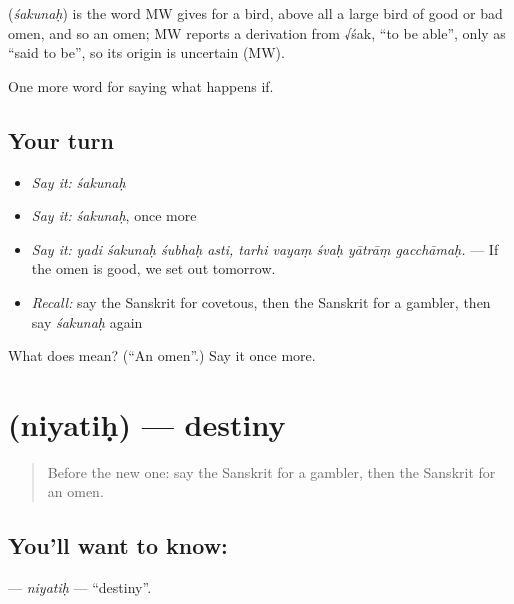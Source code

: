 \begin{cousinweb}
\textbf{} (\emph{śakunaḥ}) is the word MW gives for a bird, above all a large bird of good or bad omen, and so an omen; MW reports a derivation from √śak, \textquotedblleft{}to be able\textquotedblright{}, only as \textquotedblleft{}said to be\textquotedblright{}, so its origin is uncertain (MW).
\end{cousinweb}

\begin{grammarlens}[title={What you've built}]
One more word for saying what happens if.
\end{grammarlens}

\subsection*{Your turn}
\begin{itemize}
\raggedright
  \item \emph{Say it:} \emph{śakunaḥ}
  \item \emph{Say it:} \emph{śakunaḥ}, once more
  \item \emph{Say it:} \emph{yadi śakunaḥ śubhaḥ asti, tarhi vayaṃ śvaḥ yātrāṃ gacchāmaḥ.} — If the omen is good, we set out tomorrow.
  \item \emph{Recall:} say the Sanskrit for covetous, then the Sanskrit for a gambler, then say \emph{śakunaḥ} again
\end{itemize}

\begin{tcolorbox}[breakable,colback=teal!4,colframe=teal!35!black,title={Before you move on}]
What does  mean? (\textquotedblleft{}An omen\textquotedblright{}.) Say it once more.
\end{tcolorbox}
\section[\texorpdfstring{\sk{नियतिः} (niyatiḥ)}{नियतिः (niyatiḥ)}]{ (niyatiḥ) — destiny}

\label{lesson:SA-C538-niyatih}



\begin{quote}
Before the new one: say the Sanskrit for a gambler, then the Sanskrit for an omen.
\end{quote}

\subsection*{You'll want to know: }
\textbf{} — \emph{niyatiḥ} — \textquotedblleft{}destiny\textquotedblright{}.

